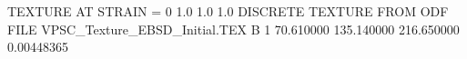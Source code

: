 TEXTURE AT STRAIN = 0
1.0   1.0   1.0
DISCRETE TEXTURE FROM ODF FILE VPSC_Texture\RD_EBSD_Initial.TEX
B 1
70.610000	135.140000	216.650000	0.00448365
